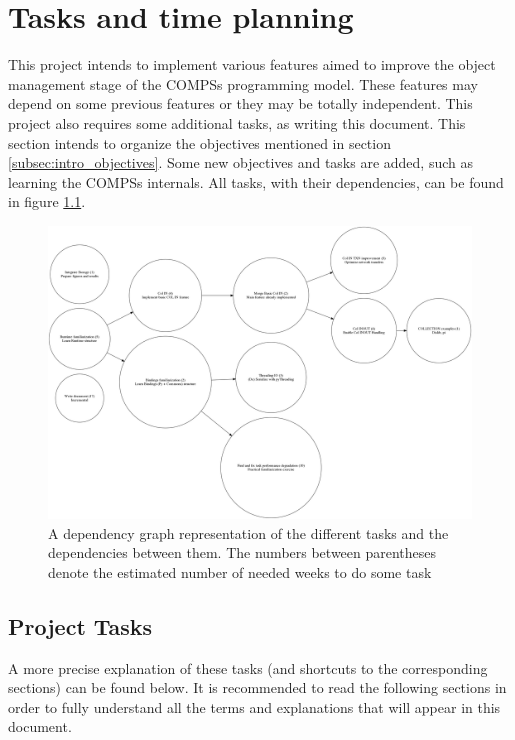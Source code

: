 \chapter{Tasks and time planning}
\label{sec:tasks_and_time_planning}
This project intends to implement various features aimed to improve the object management stage of the COMPSs programming model. These features may depend on some previous features or they may be totally independent. This project also requires some additional tasks, as writing this document. This section intends to organize the objectives mentioned in section \ref{subsec:intro_objectives}. Some new objectives and tasks are added, such as learning the COMPSs internals. All tasks, with their dependencies, can be found in figure \ref{fig:thesis_task_graph}.

\begin{figure}[ht!]
\includegraphics[scale = 0.23]{figures/thesis_task_graph.png}
\caption{A dependency graph representation of the different tasks and the dependencies between them. The numbers between parentheses denote the estimated number of needed weeks to do some task}
\label{fig:thesis_task_graph}
\end{figure}

\section{Project Tasks}
\label{subsec:project_tasks}
A more precise explanation of these tasks (and shortcuts to the corresponding sections) can be found below. It is recommended to read the following sections in order to fully understand all the terms and explanations that will appear in this document.

